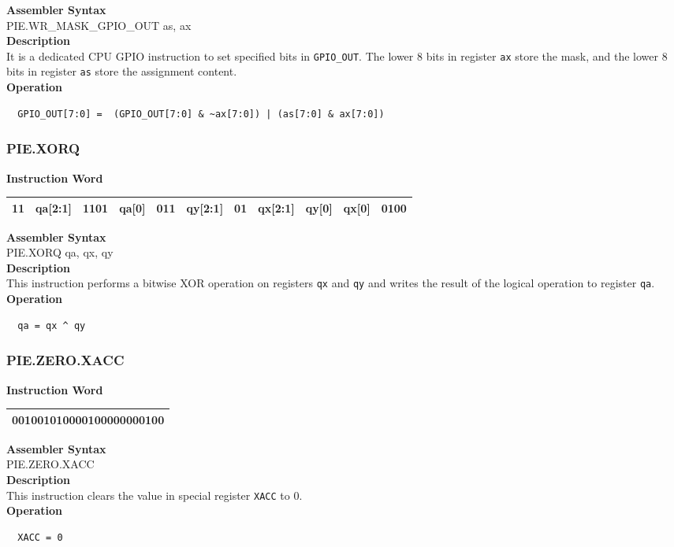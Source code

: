 \textbf{Assembler Syntax} \\
PIE.WR\_MASK\_GPIO\_OUT as, ax \\
\textbf{Description} \\
It is a dedicated CPU GPIO instruction to set specified bits in \lstinline{GPIO_OUT}. The lower 8 bits in register \lstinline{ax} store the mask, and the lower 8 bits in register \lstinline{as} store the assignment content.\\
\textbf{Operation}
\begin{lstlisting}
  GPIO_OUT[7:0] =  (GPIO_OUT[7:0] & ~ax[7:0]) | (as[7:0] & ax[7:0])
\end{lstlisting}

\newpage
\subsubsection{PIE.XORQ}\label{instruction:PIEXORQ}
\setlength\tabcolsep{6pt}
\textbf{Instruction Word} \\
\begin{tabular}{|c|c|c|c|c|c|c|c|c|c|c|}
	\hline
	11 & qa[2:1] & 1101 & qa[0] & 011 & qy[2:1] & 01 & qx[2:1] & qy[0] & qx[0] & 0100 \\
	\hline
\end{tabular}

\textbf{Assembler Syntax} \\
PIE.XORQ qa, qx, qy \\
\textbf{Description} \\
This instruction performs a bitwise XOR operation on registers \lstinline{qx} and \lstinline{qy} and writes the result of the logical operation to register \lstinline{qa}.\\
\textbf{Operation}
\begin{lstlisting}
  qa = qx ^ qy
\end{lstlisting}

\newpage
\subsubsection{PIE.ZERO.XACC}\label{instruction:PIEZEROXACC}
\setlength\tabcolsep{6pt}
\textbf{Instruction Word} \\
\begin{tabular}{|c|}
	\hline
	001001010000100000000100 \\
	\hline
\end{tabular}

\textbf{Assembler Syntax} \\
PIE.ZERO.XACC  \\
\textbf{Description} \\
This instruction clears the value in special register \lstinline{XACC} to 0.\\
\textbf{Operation}
\begin{lstlisting}
  XACC = 0
\end{lstlisting}

